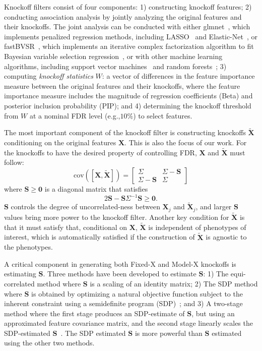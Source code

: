 \documentclass[12pt,Times]{article}
\def\cite{\citep}
\def\0{{\mathbf{0}}}
\def\tX{{\mathbf{\tilde{X}}}}
\def\X{{\mathbf{X}}}
\def\S{{\mathbf{S}}}
\def\cov{{\textrm{cov}}}
\begin{document}
Knockoff filters consist of four components: 1) constructing knockoff features;  2) conducting association analysis by jointly analyzing the original features and their knockoffs. The joint analysis can be conducted with either glmnet~\cite{glmnet}, which implements penalized regression methods, including LASSO~\cite{lasso} and Elastic-Net~\cite{elastic.net}, or fastBVSR~\cite{fastbvsr}, which implements an iterative complex factorization algorithm to fit Bayesian variable selection regression~\cite{pimass}, or with other machine learning algorithms, including support vector machines~\cite{svm} and random forests~\cite{random.forests}; 3) computing \emph{knockoff statistics} $W$: a vector of differences in the feature importance measure between the original features and their knockoffs, where the feature importance measure includes the magnitude of regression coefficients (Beta) and posterior inclusion probability (PIP);  and 4) determining the knockoff threshold from $W$ at a nominal FDR level (e.g.,$10\%$) to select features.  
 
The most important component of the knockoff filter is constructing knockoffs $\tX$ conditioning on the original features $\X$. This is also the focus of our work.  For the knockoffs to have the desired property of controlling FDR, $\X$ and $\tX$ must follow:  
\begin{equation}\label{intro.cov}
\cov\left([\X, \tX]\right) = \begin{bmatrix} \Sigma & \Sigma-\S \\ \Sigma-\S & \Sigma \end{bmatrix}
\end{equation}
where $\S\ge\0$ is a diagonal matrix that satisfies 
\begin{equation}\label{intro.cond}
2\S - \S\Sigma^{-1}\S \ge \0. 
\end{equation}
$\S$ controls the degree of uncorrelated-ness between $\X_j$ and $\tX_j$, and larger $\S$ values bring more power to the knockoff filter. 
Another key condition for $\tX$ is that it must satisfy that, conditional on $\X$, $\tX$ is independent of phenotypes of interest, which is automatically satisfied if the construction of $\tX$ is agnostic to the phenotypes. 
 
A critical component in generating both Fixed-X and Model-X knockoffs is estimating $\S$.  Three methods have been developed to estimate $\S$: 1) The equi-correlated method where $\S$ is a scaling of an identity matrix; 2) The SDP method where $\S$ is obtained by optimizing a natural objective function subject to the inherent constraint using a semidefinite program (SDP)~\cite{barber.candes.15}; and 3) A two-stage method where the first stage produces an SDP-estimate of $\S$, but using an approximated feature covariance matrix, and the second stage linearly scales the SDP-estimated $\S$~\cite{candes.etal.18}. The SDP estimated $\S$ is more powerful than $\S$ estimated using the other two methods. 
\end{document}
